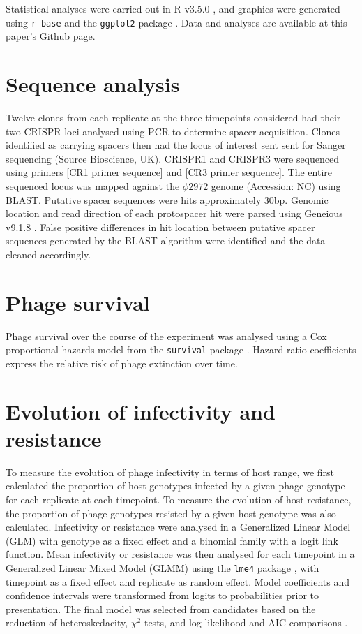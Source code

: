 \documentclass [12pt, a4paper, twoside]  {article}
\begin{document}
Statistical analyses were carried out in R v3.5.0 \citep{R}, and graphics were generated using \texttt{r-base} and the \texttt{ggplot2} package \citep{ggplot2}. Data and analyses are available at this paper's Github page.

\section*{Sequence analysis}
Twelve clones from each replicate at the three timepoints considered had their two CRISPR loci analysed using PCR to determine spacer acquisition. Clones identified as carrying spacers then had the locus of interest sent sent for Sanger sequencing (Source Bioscience, UK). CRISPR1 and CRISPR3 were sequenced using primers [CR1 primer sequence] and [CR3 primer sequence]. The entire sequenced locus was mapped against the $\phi 2972$ genome (Accession: NC) using BLAST. Putative spacer sequences were hits approximately 30bp. Genomic location and read direction of each protospacer hit were parsed using Geneious v9.1.8 \citep{kearse2012geneious}. False positive differences in hit location between putative spacer sequences generated by the BLAST algorithm were identified and the data cleaned accordingly. 

\section*{Phage survival}
Phage survival over the course of the experiment was analysed using a Cox proportional hazards model from the \texttt{survival} package \citep{survival}. Hazard ratio coefficients express the relative risk of phage extinction over time. 

\section*{Evolution of infectivity and resistance}
To measure the evolution of phage infectivity in terms of host range, we first calculated the proportion of host genotypes infected by a given phage genotype for each replicate at each timepoint. To measure the evolution of host resistance, the proportion of phage genotypes resisted by a given host genotype was also calculated. Infectivity or resistance were analysed in a Generalized Linear Model (GLM) with genotype as a fixed effect and a binomial family with a logit link function. Mean infectivity or resistance was then analysed for each timepoint in a Generalized Linear Mixed Model (GLMM) using the \texttt{lme4} package \citep{lme4}, with timepoint as a fixed effect and replicate as random effect. Model coefficients and confidence intervals were transformed from logits to probabilities prior to presentation. The final model was selected from candidates based on the reduction of heteroskedacity, $\chi ^2$ tests, and log-likelihood and AIC comparisons \citep{akaike1973,burnham2003model,burnham2004aic}.
\end{document}
